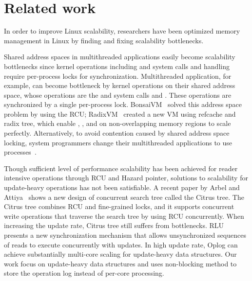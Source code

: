 \section{Related work} \label{sec:RelatedWork}
In order to improve Linux scalability, researchers have been optimized memory
management in Linux by finding and fixing scalability bottlenecks.

Shared address spaces in multithreaded applications 
easily become scalability bottlenecks since kernel operations 
including  and  system calls and 
 handling require per-process locks for synchronization.
Multithreaded application, for example, can become bottleneck by kernel
operations on their shared address space, whose operations are the 
and  system calls and .
These operations are synchronized by a single per-process lock.
BonsaiVM~\cite{AustinTClements2012RCUBalancedTrees} solved this address space
problem by using the RCU;
RadixVM~\cite{Clements2013RadixVM} created a new VM using refcache and radix
tree, which enable , , and  on
non-overlapping memory regions to scale perfectly.
Alternatively, to avoid contention caused by shared address space locking,
system programmers change their multithreaded applications to use
processes~\cite{SilasBoydWickizer2010LinuxScales48}.


Though sufficient level of performance scalability has been achieved for 
reader intensive operations through RCU and Hazard pointer, 
solutions to scalability for update-heavy operations has not been satisfiable.
A recent paper by Arbel and Attiya~\cite{Arbel2014ConcurrentRCU} shows a new
design of concurrent search tree called the Citrus tree. The Citrus tree
combines RCU and fine-grained locks, and it supports concurrent write
operations that traverse the search tree by using RCU concurrently.
When increasing the update rate, Citrus tree still suffers from bottlenecks.
RLU~\cite{Matveev2015RLU} presents a new synchronization mechanism that allows
unsynchronized sequences of reads to execute concurrently with updates.
In high update rate, Oplog can achieve substantially multi-core scaling for
update-heavy data structures.
Our work focus on update-heavy data structures and uses non-blocking method to
 store the operation log instead of per-core processing.



